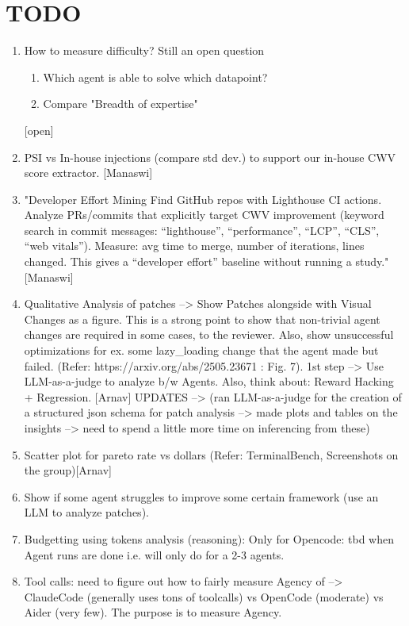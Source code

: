 \section{TODO}

\begin{enumerate}
    \item How to measure difficulty? Still an open question
    \begin{enumerate}
        \item Which agent is able to solve which datapoint?
        \item Compare "Breadth of expertise"
    \end{enumerate} [open]
    \item PSI vs In-house injections (compare std dev.) to support our in-house CWV score extractor. [Manaswi]
    \item "Developer Effort Mining Find GitHub repos with Lighthouse CI actions. Analyze PRs/commits that explicitly target CWV improvement (keyword search in commit messages: “lighthouse”, “performance”, “LCP”, “CLS”, “web vitals”). Measure: avg time to merge, number of iterations, lines changed. This gives a “developer effort” baseline without running a study." [Manaswi] 
    \item Qualitative Analysis of patches --> Show Patches alongside with Visual Changes as a figure. This is a strong point to show that non-trivial agent changes are required in some cases, to the reviewer. Also, show unsuccessful optimizations for ex. some lazy\_loading change that the agent made but failed. (Refer: https://arxiv.org/abs/2505.23671 : Fig. 7). 1st step --> Use LLM-as-a-judge to analyze b/w Agents. Also, think about: Reward Hacking + Regression. [Arnav] UPDATES --> (ran LLM-as-a-judge for the creation of a structured json schema for patch analysis --> made plots and tables on the insights --> need to spend a little more time on inferencing from these)
    \item Scatter plot for pareto rate vs dollars (Refer: TerminalBench, Screenshots on the group)[Arnav]
    \item Show if some agent struggles to improve some certain framework (use an LLM to analyze patches). 
    \item Budgetting using tokens analysis (reasoning): Only for Opencode: tbd when Agent runs are done i.e. will only do for a 2-3 agents.
    \item Tool calls: need to figure out how to fairly measure Agency of --> ClaudeCode (generally uses tons of toolcalls) vs OpenCode (moderate) vs Aider (very few). The purpose is to measure Agency.
\end{enumerate}

